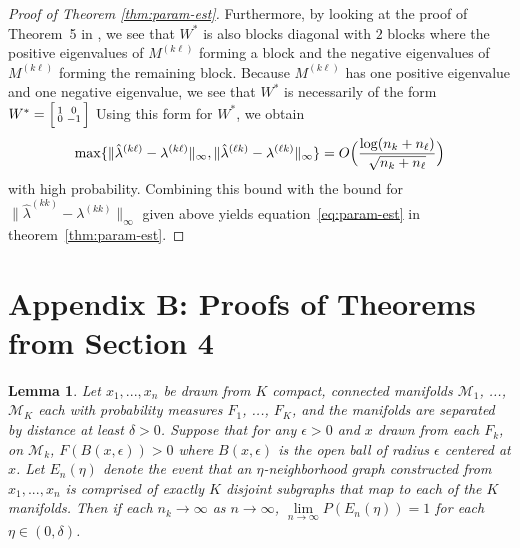 \documentclass[
  12pt,
]{article}
\newtheorem{lemma}{Lemma}[section]
\theoremstyle{definition}
\theoremstyle{definition}
\theoremstyle{definition}
\theoremstyle{definition}
\theoremstyle{remark}
\begin{document}
\begin{proof}[Proof of Theorem \ref{thm:param-est}]
Furthermore, by looking at the proof of Theorem~5 in
\citep{rubindelanchy2017statistical}, we see that $W^{*}$ is also
blocks diagonal with $2$ blocks where the positive eigenvalues of $M^{(k \ell)}$
forming a block and the negative eigenvalues of $M^{(k \ell)}$ forming
the remaining block. 
Because $M^{(k \ell)}$ has one positive eigenvalue and one negative
eigenvalue, we see that $W^{*}$ is necessarily of the form $W^{*}
= \Bigl[\begin{smallmatrix} 1 & 0 \\ 0 & - 1\end{smallmatrix}\Bigr]$
Using this form for $W^{*}$, we obtain
$$\max\{\|\hat{\lambda}^{(k \ell)} - \lambda^{(k \ell)}\|_{\infty},
\|\hat{\lambda}^{(\ell k)} - \lambda^{(\ell k)}\|_{\infty}\}  =
O\Bigl(\frac{\log(n_k + n_{\ell})}{\sqrt{n_k + n_{\ell}}}\Bigr)$$
with high probability. Combining this bound with the bound for
$\|\hat{\lambda}^{(kk)} - \lambda^{(kk)}\|_{\infty}$ given above
yields equation~\eqref{eq:param-est} in theorem~\ref{thm:param-est}. 
\end{proof}

\section{Appendix B: Proofs of Theorems from Section 4}

\begin{lemma}
\label{lemma:no-noise}
Let $x_1, ..., x_n$ be drawn from $K$ compact, connected manifolds $\mathcal{M}_1$, ..., $\mathcal{M}_K$ each with probability measures $F_1$, ..., $F_K$, and the manifolds are separated by distance at least $\delta > 0$. 
Suppose that for any $\epsilon > 0$ and $x$ drawn from each $F_k$, on $\mathcal{M}_k$, $F(B(x, \epsilon)) > 0$ where $B(x, \epsilon)$ is the open ball of radius $\epsilon$ centered at $x$. 
Let $E_n(\eta)$ denote the event that an $\eta$-neighborhood graph constructed from $x_1, ..., x_n$ is comprised of exactly $K$ disjoint subgraphs that map to each of the $K$ manifolds. 
Then if each $n_k \to \infty$ as $n \to \infty$, $\lim\limits_{n \to \infty} P(E_n(\eta)) = 1$ for each $\eta \in (0, \delta)$. 
\end{lemma}
\end{document}

